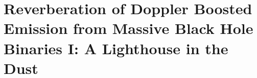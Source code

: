 \chapter[A Lighthouse in the Dust]{Reverberation of Doppler Boosted Emission from Massive Black Hole Binaries I: A Lighthouse in the Dust}
\label{ch:Dust}
\let\thefootnote\relax{}




\renewcommand\thesection{\thechapter.\arabic{section}}